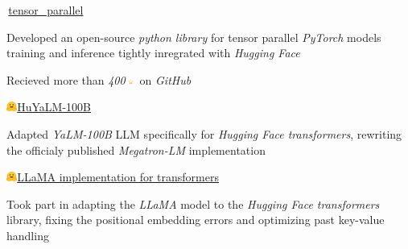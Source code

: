 
\begin{cventries}
  \cventry
    {} %
    {\,\faGithub\acvHeaderIconSep\href{https://github.com/BlackSamorez/tensor_parallel}{tensor\_parallel}} %
    {} %
    {} %
    {
      \begin{cvitems} %
        \item { Developed an open-source \textit{python library} for tensor parallel \textit{PyTorch} models training and inference tightly inregrated with \textit{Hugging Face} }
        \item { Recieved more than \textit{400}\includegraphics[width=3.5mm]{image.png} on \textit{GitHub} }
      \end{cvitems}
    }

  \cventry
    {} %
    {\includegraphics[width=3.5mm]{hf.jpg}\acvHeaderIconSep\href{https://huggingface.co/BlackSamorez/HuYaLM-100B-fp16}{HuYaLM-100B}} %
    {} %
    {} %
    {
      \begin{cvitems} %
        \item { Adapted \textit{YaLM-100B} LLM specifically for \textit{Hugging Face transformers}, rewriting the officialy published \textit{Megatron-LM} implementation }
      \end{cvitems}
    }

  \cventry
    {} %
    {\includegraphics[width=3.5mm]{hf.jpg}\acvHeaderIconSep\href{https://huggingface.co/docs/transformers/main/model_doc/llama}{LLaMA implementation for transformers}} %
    {} %
    {} %
    {
      \begin{cvitems} %
        \item {Took part in adapting the \textit{LLaMA} model to the \textit{Hugging Face transformers} library, fixing the positional embedding errors and optimizing past key-value handling}
      \end{cvitems}
    }
    

\end{cventries}
